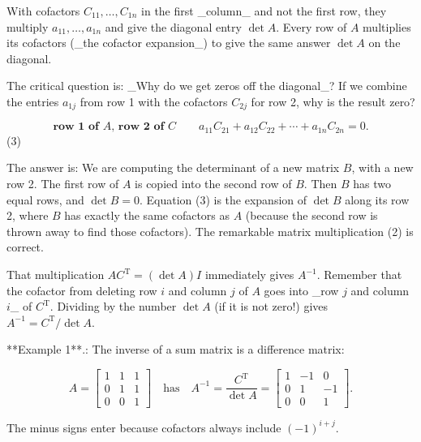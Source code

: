 With cofactors \(C_{11},\ldots,C_{1n}\) in the first _column_ and not the first row, they multiply \(a_{11},\ldots,a_{1n}\) and give the diagonal entry \(\det A\). Every row of \(A\) multiplies its cofactors (_the cofactor expansion_) to give the same answer \(\det A\) on the diagonal.

The critical question is: _Why do we get zeros off the diagonal_? If we combine the entries \(a_{1j}\) from row 1 with the cofactors \(C_{2j}\) for row 2, why is the result zero?

\[\textbf{row 1 of }A\textbf{, row 2 of }C\qquad a_{11}C_{21}+a_{12}C_{22}+\cdots+a_{1n}C_{2n}=0.\] (3)

The answer is: We are computing the determinant of a new matrix \(B\), with a new row 2. The first row of \(A\) is copied into the second row of \(B\). Then \(B\) has two equal rows, and \(\det B=0\). Equation (3) is the expansion of \(\det B\) along its row 2, where \(B\) has exactly the same cofactors as \(A\) (because the second row is thrown away to find those cofactors). The remarkable matrix multiplication (2) is correct.

That multiplication \(AC^{\mathrm{T}}=(\det A)I\) immediately gives \(A^{-1}\). Remember that the cofactor from deleting row \(i\) and column \(j\) of \(A\) goes into _row \(j\) and column \(i\)_ of \(C^{\mathrm{T}}\). Dividing by the number \(\det A\) (if it is not zero!) gives \(A^{-1}=C^{\mathrm{T}}/\det A\).

**Example 1**.: The inverse of a sum matrix is a difference matrix:

\[A=\begin{bmatrix}1&1&1\\ 0&1&1\\ 0&0&1\end{bmatrix}\quad\text{has}\quad A^{-1}=\frac{C^{\mathrm{T}}}{\det A}= \begin{bmatrix}1&-1&0\\ 0&1&-1\\ 0&0&1\end{bmatrix}.\]

The minus signs enter because cofactors always include \((-1)^{i+j}\).

 